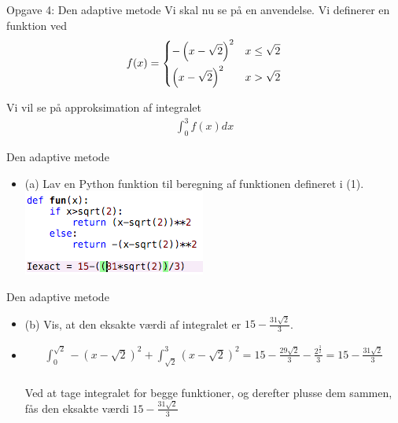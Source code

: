 \begin{frame}{Opgave 4: Den adaptive metode}
    Vi skal nu se på en anvendelse. Vi definerer en funktion ved
\begin{align*}
f(x) = 
\begin{dcases}
- \left( x - \sqrt{2} \right)^2 & x \leq \sqrt{2}\\
\left( x - \sqrt{2} \right)^2 & x > \sqrt{2} \\
\end{dcases}
\end{align*} 
    
    Vi vil se på approksimation af integralet 
    \begin{align}
    \int_{0}^{3}f(x)dx    
    \end{align}
\end{frame}


\begin{frame}{Den adaptive metode}
    \begin{itemize}
        \item (a) Lav en Python funktion til beregning af funktionen defineret i (1).
        \includegraphics[]{images/1.4(a).png}
    \end{itemize}
\end{frame}


\begin{frame}{Den adaptive metode}
    \begin{itemize}
        \item (b) Vis, at den eksakte værdi af integralet er $15-\frac{31\sqrt{2}}{3}$.
        \item \begin{align*}
            \int^{\sqrt{2}}_0-(x-\sqrt{2})^2+\int^3_{\sqrt{2}}(x-\sqrt{2})^2=15-\frac{29\sqrt{2}}{3}-\frac{2^{\frac{3}{2}}}{3}=15-\frac{31\sqrt{2}}{3} 
            \end{align*} \\
            Ved at tage integralet for begge funktioner, og derefter plusse dem sammen, fås den eksakte værdi $15-\frac{31\sqrt{2}}{3}$ \\
    \end{itemize}
\end{frame}


